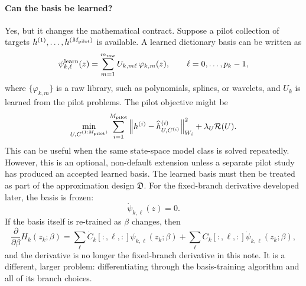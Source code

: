 \documentclass[11pt]{article}
\numberwithin{equation}{section}
\begin{document}
\paragraph{Can the basis be learned?}
Yes, but it changes the mathematical contract.  Suppose a pilot collection of
targets \(h^{(1)},\ldots,h^{(M_{\rm pilot})}\) is available.  A learned
dictionary basis can be written as
\begin{equation}
    \psi_{k,\ell}^{\rm learn}(z)
    =
    \sum_{m=1}^{m_{\rm raw}}
    U_{k,m\ell}\,\varphi_{k,m}(z),
    \qquad \ell=0,\ldots,p_k-1,
    \label{eq:p30-basis-learned}
\end{equation}
where \(\{\varphi_{k,m}\}\) is a raw library, such as polynomials, splines, or
wavelets, and \(U_k\) is learned from the pilot problems.  The pilot objective
might be
\begin{equation}
    \min_{U,C^{(1:M_{\rm pilot})}}
    \sum_{i=1}^{M_{\rm pilot}}
    \left\|
    h^{(i)}-\widehat h^{(i)}_{U,C^{(i)}}
    \right\|_{W_i}^2
    +\lambda_U\mathcal R(U).
    \label{eq:p30-basis-learn-objective}
\end{equation}
This can be useful when the same state-space model class is solved repeatedly.
However, this is an optional, non-default extension unless a separate pilot
study has produced an accepted learned basis.  The learned basis must then be
treated as part of the approximation design \(\mathfrak D\).  For the
fixed-branch derivative developed later, the basis is frozen:
\begin{equation}
    \dot\psi_{k,\ell}(z)=0.
    \label{eq:p30-basis-frozen-derivative}
\end{equation}
If the basis itself is re-trained as \(\beta\) changes, then
\begin{equation}
    \frac{\partial}{\partial\beta}
    H_k(z_k;\beta)
    =
    \sum_{\ell}
    \dot C_k[:,\ell,:]\psi_{k,\ell}(z_k;\beta)
    +
    \sum_{\ell}
    C_k[:,\ell,:]\dot\psi_{k,\ell}(z_k;\beta),
    \label{eq:p30-basis-moving-derivative}
\end{equation}
and the derivative is no longer the fixed-branch derivative in this note.  It
is a different, larger problem: differentiating through the basis-training
algorithm and all of its branch choices.
\end{document}
